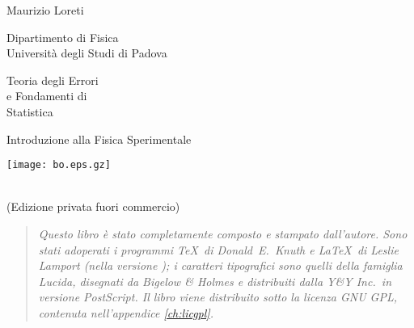 
\enlargethispage{20mm}
{\vspace*{-20mm}\centering%
  {\fontsize{18}{22}\selectfont
    Maurizio Loreti\par}\vspace*{5mm}
  {\fontsize{14}{17}\selectfont
    Dipartimento di Fisica \\
    Universit\`a degli Studi di Padova\par}\vspace*{7mm}
  \makebox[\textwidth][c]{\rule{1.2\textwidth}{3pt}}\par\vspace*{7mm}
  {\fontsize{37}{42}\selectfont
    Teoria degli Errori \\ e Fondamenti di \\
    Statistica\par}\vspace*{10mm}
  {\fontsize{20}{24}\selectfont
    Introduzione alla Fisica Sperimentale\par}\vspace*{10mm}
  \makebox[\textwidth][c]{\rule{1.1\textwidth}{3pt}}\par\vfill
  \texttt{[image: bo.eps.gz]} \\[5mm]
  {\fontsize{14}{17}\selectfont
    \thismonth\ \number\year \\
    (Edizione privata fuori commercio)\par}}
\clearpage
\begin{quote}
  \footnotesize\itshape Questo libro \`e stato completamente
  composto e stampato dall'autore.  Sono stati adoperati i
  programmi \TeX\ di Donald~E.~Knuth e \LaTeX\ di Leslie
  Lamport (nella versione \LaTeXe); i caratteri tipografici
  sono quelli della famiglia Lucida, disegnati da Bigelow \&
  Holmes e distribuiti dalla Y\&Y Inc.\ in versione
  PostScript\textsuperscript{\textregistered}.  Il libro
  viene distribuito sotto la licenza GNU GPL, contenuta
  nell'appendice \ref{ch:licgpl}.
\end{quote}
\vfill
